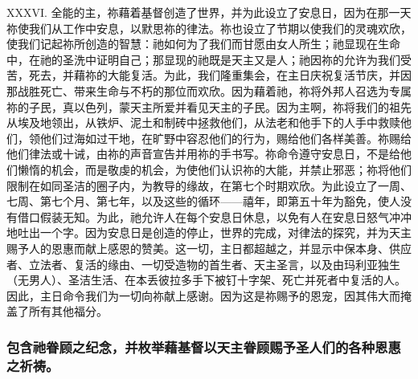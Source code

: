 XXXVI. 全能的主，祢藉着基督创造了世界，并为此设立了安息日，因为在那一天祢使我们从工作中安息，以默思祢的律法。祢也设立了节期以使我们的灵魂欢欣，使我们记起祢所创造的智慧：祂如何为了我们而甘愿由女人所生；祂显现在生命中，在祂的圣洗中证明自己；那显现的祂既是天主又是人；祂因祢的允许为我们受苦，死去，并藉祢的大能复活。为此，我们隆重集会，在主日庆祝复活节庆，并因那战胜死亡、带来生命与不朽的那位而欢欣。因为藉着祂，祢将外邦人召选为专属祢的子民，真以色列，蒙天主所爱并看见天主的子民。因为主啊，祢将我们的祖先从埃及地领出，从铁炉、泥土和制砖中拯救他们，从法老和他手下的人手中救赎他们，领他们过海如过干地，在旷野中容忍他们的行为，赐给他们各样美善。祢赐给他们律法或十诫，由祢的声音宣告并用祢的手书写。祢命令遵守安息日，不是给他们懒惰的机会，而是敬虔的机会，为使他们认识祢的大能，并禁止邪恶；祢将他们限制在如同圣洁的圈子内，为教导的缘故，在第七个时期欢欣。为此设立了一周、七周、第七个月、第七年，以及这些的循环——禧年，即第五十年为豁免，使人没有借口假装无知。为此，祂允许人在每个安息日休息，以免有人在安息日怒气冲冲地吐出一个字。因为安息日是创造的停止，世界的完成，对律法的探究，并为天主赐予人的恩惠而献上感恩的赞美。这一切，主日都超越之，并显示中保本身、供应者、立法者、复活的缘由、一切受造物的首生者、天主圣言，以及由玛利亚独生（无男人）、圣洁生活、在本丢彼拉多手下被钉十字架、死亡并死者中复活的人。因此，主日命令我们为一切向祢献上感谢。因为这是祢赐予的恩宠，因其伟大而掩盖了所有其他福分。\par


\subsubsection{包含祂眷顾之纪念，并枚举藉基督以天主眷顾赐予圣人们的各种恩惠之祈祷。}


